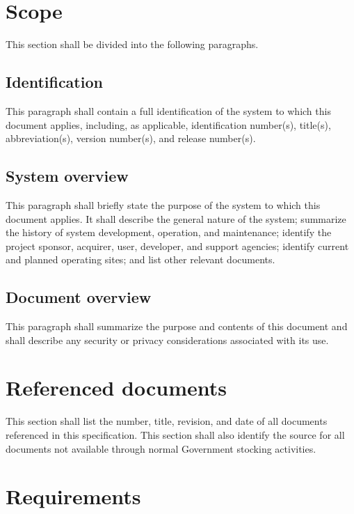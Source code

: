 \documentclass{fidata-report-template}
\begin{document}
\section{Scope}

This section shall be divided into the following paragraphs.

\subsection{Identification}

This paragraph shall contain a full identification of the system to
which this document applies, including, as applicable, identification
number(s), title(s), abbreviation(s), version number(s), and release
number(s).

\subsection{System overview}

This paragraph shall briefly state the purpose of the system to which
this document applies. It shall describe the general nature of the
system; summarize the history of system development, operation, and
maintenance; identify the project sponsor, acquirer, user, developer,
and support agencies; identify current and planned operating sites; and
list other relevant documents.

\subsection{Document overview}

This paragraph shall summarize the purpose and contents of this document
and shall describe any security or privacy considerations associated
with its use.

\section{Referenced documents}

This section shall list the number, title, revision, and date of all
documents referenced in this specification. This section shall also
identify the source for all documents not available through normal
Government stocking activities.

\section{Requirements}
\end{document}
